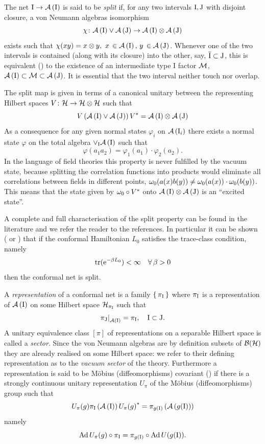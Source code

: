\begin{definition}
The net $\textrm{I}\to\mathcal{A}\left(\textrm{I}\right)$ is said to be \emph{split} 
if, for any two intervals $\textrm{I}, \textrm{J}$ with disjoint
closure, a von Neumann algebras isomorphism
\[
\chi\colon\mathcal{A}\left(\textrm{I}\right)\vee\mathcal{A}\left(\textrm{J}\right)\to\mathcal{A}\left(\textrm{I}\right)\otimes
\mathcal{A}\left(\textrm{J}\right)
\]
exists such that $\chi(x y)=x\otimes y,\ 
x\,\in\alg{\I},\,y\,\in\alg{\textrm{J}}$.
Whenever one of the two intervals is contained 
(along with its closure) into the other, say, 
$\overline{\textrm{I}}\subset\textrm{J}$, this is equivalent 
(\cite*{Longo:private}) to the
existence of an intermediate type I factor $\mathcal{M}$,
$\mathcal{A}\left(\textrm{I}\right)\subset\mathcal{M}\subset\mathcal{A}\left(\textrm{J}\right)$. It is
essential that the two interval neither touch
nor overlap.

\bigskip
The split map is given in terms of a canonical 
unitary between the representing Hilbert spaces 
$V\colon\mathcal{H}\to\mathcal{H}\otimes\mathcal{H}$ such that
\[
V\left(\mathcal{A}\left(\textrm{I}\right)\vee\mathcal{A}\left(\textrm{J}\right)\right)V^*
=\mathcal{A}\left(\textrm{I}\right)\otimes\mathcal{A}\left(\textrm{J}\right)
\]
As a consequence  for any given normal states 
$\varphi_i$ on $\mathcal{A}\left(\textrm{I}_i\right)$ there exists a normal
state $\varphi$ on the total algebra $\vee_{\textrm{I}}\mathcal{A}\left(\textrm{I}\right)$ such that
\[
\varphi\left(a_1 a_2\right)=\varphi_1(a_1)\cdot\varphi_2(a_2).
\]
In the language of field theories this property is never fulfilled
by the vacuum state, because splitting the correlation functions
into products would eliminate all correlations between fields
in different points, $\omega_0(a(x)b(y))\neq \omega_0(a(x))\cdot\omega_0(b(y))$.
This means that the state given by $\omega_0\circ V^*$ onto 
$\mathcal{A}\left(\textrm{I}\right)\otimes\mathcal{A}\left(\textrm{J}\right)$ is an ``excited state''.

A complete and full characterisation of the split property can 
be found in the literature and we refer the reader to the references. 
In particular it can be shown (\cite*{Longo:private} or \cite*{DLR:2001}) 
that if the conformal Hamiltonian $L_0$ satisfies the trace-class
condition, namely
\[
\operatorname{tr}(\operatorname{e}^{-\beta L_0})<\infty\quad\forall\,\beta>0
\]
then the conformal net is split.
\end{definition}
A \emph{representation} of a conformal net is a family 
$\set{\pi_{\textrm{I}}}$ where $\pi_{\textrm{I}}$ is a representation of $\mathcal{A}\left(\textrm{I}\right)$
on some Hilbert space $\mathcal{H}_{\pi_{\textrm{I}}}$ such that
\[
{\pi_{\textrm{J}}\lvert}_{\mathcal{A}\left(\textrm{I}\right)}=\pi_{\textrm{I}},\quad \textrm{I}\subset\textrm{J}.
\]
A unitary equivalence class $[\pi]$ of representations on a separable
Hilbert space is called a \emph{sector}. Since the von Neumann algebras
are by definition subsets of $\mathcal{B}(\mathcal{H})$ they are already realised on some 
Hilbert space: we refer to their defining representation as to the 
\emph{vacuum sector} of the theory.
Furthermore a representation is said to be M\"obius (diffeomorphisms) 
covariant (\cite*{Ca2004}) if there is a strongly continuous unitary 
representation $U_{\pi}$ of the M\"obius (diffeomorphisms) group such that
\[
U_{\pi}(g)\pi_{\textrm{I}}\left(\mathcal{A}\left(\textrm{I}\right)\right){U_{\pi}(g)}^*=
\pi_{g(\textrm{I})}\left(\mathcal{A}\left(g(\textrm{I})\right)\right)
\]
namely
\[
\operatorname{Ad} U_{\pi}(g)\circ\pi_{\textrm{I}}=\pi_{g(\textrm{I})}\circ\operatorname{Ad} U(g(\textrm{I})). 
\]

